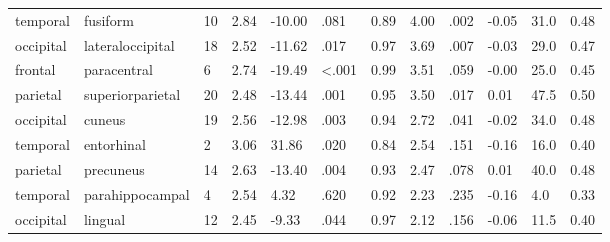 \documentclass{article}
\begin{document}
\begin{longtable}{llR{1.5cm}R{1cm}R{1.3cm}R{1cm}R{1cm}R{1.3cm}R{1cm}R{1.8cm}R{1.3cm}R{1.8cm}}
  temporal &                  fusiform &           10 &                  2.84 &           -10.00 &               .081 &                               0.89 &                          4.00 &                            .002 & -0.05 &   31.0 &      0.48 \\
 occipital &          lateraloccipital &           18 &                  2.52 &           -11.62 &               .017 &                               0.97 &                          3.69 &                            .007 & -0.03 &   29.0 &      0.47 \\
   frontal &               paracentral &            6 &                  2.74 &           -19.49 &      \textless.001 &                               0.99 &                          3.51 &                            .059 & -0.00 &   25.0 &      0.45 \\
  parietal &          superiorparietal &           20 &                  2.48 &           -13.44 &               .001 &                               0.95 &                          3.50 &                            .017 &  0.01 &   47.5 &      0.50 \\
 occipital &                    cuneus &           19 &                  2.56 &           -12.98 &               .003 &                               0.94 &                          2.72 &                            .041 & -0.02 &   34.0 &      0.48 \\
  temporal &                entorhinal &            2 &                  3.06 &            31.86 &               .020 &                               0.84 &                          2.54 &                            .151 & -0.16 &   16.0 &      0.40 \\
  parietal &                 precuneus &           14 &                  2.63 &           -13.40 &               .004 &                               0.93 &                          2.47 &                            .078 &  0.01 &   40.0 &      0.48 \\
  temporal &           parahippocampal &            4 &                  2.54 &             4.32 &               .620 &                               0.92 &                          2.23 &                            .235 & -0.16 &    4.0 &      0.33 \\
 occipital &                   lingual &           12 &                  2.45 &            -9.33 &               .044 &                               0.97 &                          2.12 &                            .156 & -0.06 &   11.5 &      0.40 \\

\end{longtable}
\end{document}
